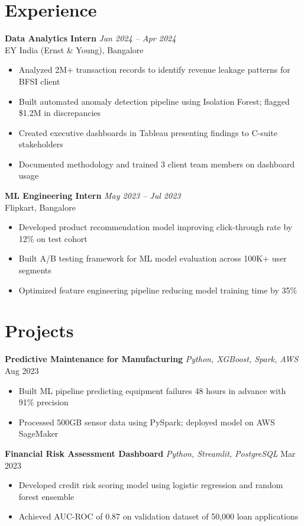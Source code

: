 \documentclass[11pt,a4paper]{article}
\begin{document}
\section{Experience}
\textbf{Data Analytics Intern} \hfill \textit{Jan 2024 -- Apr 2024}\\
EY India (Ernst \& Young), Bangalore
\begin{itemize}
    \item Analyzed 2M+ transaction records to identify revenue leakage patterns for BFSI client
    \item Built automated anomaly detection pipeline using Isolation Forest; flagged \$1.2M in discrepancies
    \item Created executive dashboards in Tableau presenting findings to C-suite stakeholders
    \item Documented methodology and trained 3 client team members on dashboard usage
\end{itemize}

\vspace{4pt}
\textbf{ML Engineering Intern} \hfill \textit{May 2023 -- Jul 2023}\\
Flipkart, Bangalore
\begin{itemize}
    \item Developed product recommendation model improving click-through rate by 12\% on test cohort
    \item Built A/B testing framework for ML model evaluation across 100K+ user segments
    \item Optimized feature engineering pipeline reducing model training time by 35\%
\end{itemize}

\section{Projects}
\textbf{Predictive Maintenance for Manufacturing} \quad\textit{Python, XGBoost, Spark, AWS} \hfill Aug 2023
\begin{itemize}
    \item Built ML pipeline predicting equipment failures 48 hours in advance with 91\% precision
    \item Processed 500GB sensor data using PySpark; deployed model on AWS SageMaker
\end{itemize}

\vspace{4pt}
\textbf{Financial Risk Assessment Dashboard} \quad\textit{Python, Streamlit, PostgreSQL} \hfill Mar 2023
\begin{itemize}
    \item Developed credit risk scoring model using logistic regression and random forest ensemble
    \item Achieved AUC-ROC of 0.87 on validation dataset of 50,000 loan applications
\end{itemize}
\end{document}
